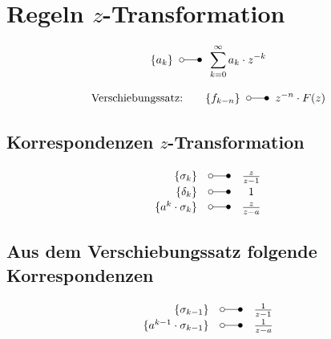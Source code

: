 \section{Regeln $z$-Transformation} 

\begin{align*}
\{ a_k \} \;\; \laplace \;\; \sum_{k=0}^{\infty} a_k \cdot z^{-k}
\end{align*}

\begin{align*}
	\mbox{Verschiebungssatz:}\qquad \{ f_{k-n} \} \;\; \laplace \;\; z^{-n} \cdot F(z)
\end{align*}

\subsection{Korrespondenzen $z$-Transformation}
\begin{align*}
\begin{array}{rcc}
	\{ \sigma_k \} & \laplace & \frac{z}{z-1}\\
	\{ \delta_k \} & \laplace & 1\\
	\{ a^k \cdot \sigma_k \} & \laplace & \frac{z}{z-a}
\end{array}
\end{align*}

\subsection{Aus dem Verschiebungssatz folgende Korrespondenzen}
\begin{align*}
\begin{array}{rcll}
\{ \sigma_{k-1} \} & \laplace & \frac{1}{z-1}\\
\{ a^{k-1} \cdot \sigma_{k-1} \} & \laplace & \frac{1}{z-a}
\end{array}
\end{align*}
